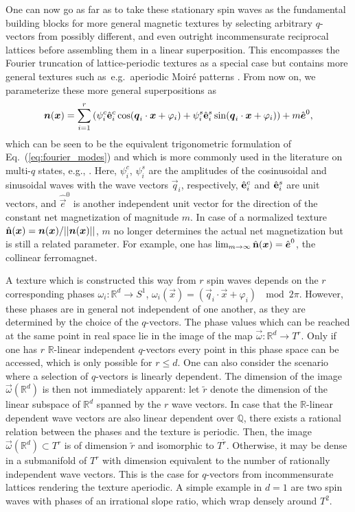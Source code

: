\documentclass[submission, Phys]{SciPost}
\begin{document}
One can now go as far as to take these stationary spin waves as the fundamental building blocks for more general magnetic textures by selecting arbitrary $q$-vectors from possibly different, and even outright incommensurate reciprocal lattices before assembling them in a linear superposition.
This encompasses the Fourier truncation of lattice-periodic textures as a special case but contains more general textures such as~e.g.~aperiodic Moir\'e patterns \cite{Shimizu2021}.
From now on, we parameterize these more general superpositions as
\begin{equation}
    \boldsymbol{n}(\boldsymbol{x})=\sum_{i=1}^r \left(\psi_i^c \hat{\mathbf{e}}_i^c \cos(\boldsymbol{q}_i\cdot\boldsymbol{x}+\varphi_i) + \psi_i^s \hat{\mathbf{e}}_i^s \sin(\boldsymbol{q}_i\cdot\boldsymbol{x}+\varphi_i) \right) + m \hat{\boldsymbol{e}}^0,
\label{eq:superposition}
\end{equation}
which can be seen to be the equivalent trigonometric formulation of Eq.~(\ref{eq:fourier_modes}) and which is more commonly used in the literature on multi-$q$ states, e.g., \cite{Shimizu2021,Shimizu2022, Nakazawa2019, Freimuth2013}.
Here, $\psi_i^c$, $\psi_i^s$ are the amplitudes of the cosinusoidal and sinusoidal waves with the wave vectors $\vec{q}_i$, respectively, $\hat{\mathbf{e}}_i^c$ and $\hat{\mathbf{e}}_i^s$ are unit vectors, and $\hat{\vec{e}}^0$ is another independent unit vector for the direction of the constant net magnetization of magnitude $m$. In case of a normalized texture $\hat{\mathbf{n}}(\boldsymbol{x})=\boldsymbol{n}(\boldsymbol{x})/||\boldsymbol{n}(\boldsymbol{x})||$, $m$ no longer determines the actual net magnetization but is still a related parameter. For example, one has $\lim_{m\to\infty} \hat{\mathbf{n}}(\boldsymbol{x}) = \hat{\boldsymbol{e}}^0$, the collinear ferromagnet.

A texture which is constructed this way from $r$ spin waves depends on the $r$ corresponding phases $\omega_i: \mathbb{R}^d \to S^1$, $\omega_i(\vec{x})=(\vec{q}_i\cdot\vec{x}+\varphi_i)~\mod 2\pi$.
However, these phases are in general not independent of one another, as they are determined by the choice of the $q$-vectors.
The phase values which can be reached at the same point in real space lie in the image of the map $\vec{\omega}: \mathbb{R}^d\to T^r$.
Only if one has $r$ $\mathbb{R}$-linear independent $q$-vectors every point in this phase space can be accessed, which is only possible for $r\leq d$.
One can also consider the scenario where a selection of $q$-vectors is linearly dependent.
The dimension of the image $\vec{\omega}(\mathbb{R}^d)$ is then not immediately apparent: 
let $\tilde{r}$ denote the dimension of the linear subspace of $\mathbb{R}^d$ spanned by the $r$ wave vectors.
In case that the $\mathbb{R}$-linear dependent wave vectors are also linear dependent over $\mathbb{Q}$, there exists a rational relation between the phases and the texture is periodic. Then, the image $\vec{\omega}(\mathbb{R}^d)\subset T^r$ is of dimension $\tilde{r}$ and isomorphic to $T^{\tilde{r}}$.
Otherwise, it may be dense in a submanifold of $T^r$ with dimension equivalent to the number of rationally independent wave vectors.
This is the case for $q$-vectors from incommensurate lattices rendering the texture aperiodic.
A simple example in $d=1$ are two spin waves with phases of an irrational slope ratio, which wrap densely around $T^2$.
\end{document}
